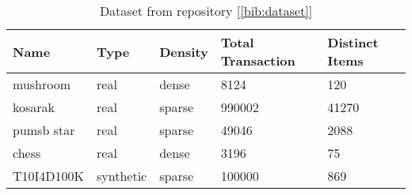 \begin{table}[t]
\centering
\begin{tabular}{|l|l|l|l|l|}
\hline 
\textbf{Name}&\textbf{Type}&\textbf{Density}&\textbf{Total Transaction} &\textbf{Distinct Items}\\ \hline
mushroom	&	real	&	dense	&	8124	&	120\\ \hline
kosarak	&	real	&	sparse	&	990002	&	41270\\ \hline
pumsb star	&	real	&	sparse	&	49046	&	2088\\ \hline
chess	&	real	&	dense	&	3196	&	75\\ \hline
T10I4D100K	&	synthetic	&	sparse	&	100000	&	869\\ \hline
	\end{tabular}
\caption{Dataset from repository [\ref{bib:dataset}]}
\label{table:dataset}
\end{table}